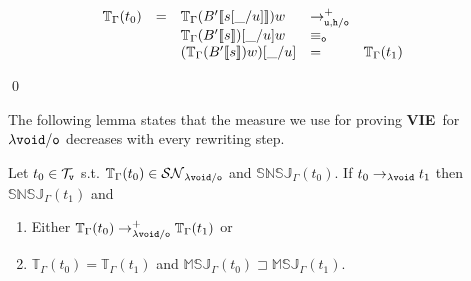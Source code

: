 \documentclass{LMCS}
\renewcommand{\>}{\rightarrow}
\def\lam{\lambda}
\def\Gam{\Gamma}
\newcommand{\Rew}[1]{\rightarrow_{#1}}
\newcommand{\SN}[1]{\mathcal{SN}_{#1}}
\newcommand{\Rewplus}[1]{\rightarrow^{+}_{#1}}
\newcommand{\termsv}{\mathcal{T}_{\tt v}}
\newcommand{\viep}{{\bf VIE}}
\newcommand{\unboxed}{{\tt u}}
\newcommand{\modulo}[2]{#1/#2}
\newcommand{\eqo}{\equiv_\osym}
\newcommand{\osym}{{\tt o}}
\newcommand{\osymb}{{\tt o}}
\newcommand{\aux}{{\tt void}}
\newcommand{\laux}{\lam\aux}
\newcommand{\lauxm}{\lam\modulo{ \aux }{ \osymb }}
\newcommand{\New}{{\tt h}}
\newcommand{\snsudd}[2]{\mathbb{SNSJ}_{#1}(#2)}
\newcommand{\ctx}[2]{#1 [ \! [#2] \! ]}
\newcommand{\etamd}[2]{\mathbb{MSJ}_{#1}(#2)}
\newcommand{\surf}[2]{\mathbb{T}_{#1}(#2)}
\newcommand{\void}{\_}
\newcommand{\gm}{\sqsupset}
\begin{document}
\begin{enumerate}[$\bullet$]
\begin{enumerate}[$-$]
{\begin{enumerate}
\[\begin{array}{llllll}
\surf{\Gam}{t_0}&=&\surf{\Gam}{\ctx{B'}{s[\void/u]}} w& \Rewplus{\modulo{\unboxed,\New}{\osym}} &&\\
&&\surf{\Gam}{\ctx{B'}{s}}[\void/u] w & \eqo &\\
&&(\surf{\Gam}{\ctx{B'}{s}} w)[\void/u] & =  &\surf{\Gam}{t_1}
\end{array}\]
\end{enumerate} }
\qed
\end{enumerate} 
\end{enumerate}


The following lemma states that the measure we use for proving
\viep\ for $\lauxm$ decreases with every rewriting step.

\begin{lem}
\label{l:lauxmes-red}
Let $t_0 \in \termsv$ s.t.   $\surf{\Gam}{t_0} \in  \SN{\lauxm}$ and 
$\snsudd{\Gam}{t_0}$. If $t_0\Rew{\laux} t_1$ then $\snsudd{\Gam}{t_1}$ and
\begin{enumerate}[$-$]
  \item Either $\surf{\Gam}{t_0} \Rewplus{\lauxm} \surf{\Gam}{t_1}$ or 
  \item $\surf{\Gam}{t_0}=\surf{\Gam}{t_1}$ and $\etamd{\Gam}{t_0} \gm \etamd{\Gam}{t_1}$.
\end{enumerate}
\end{lem}
\end{document}
